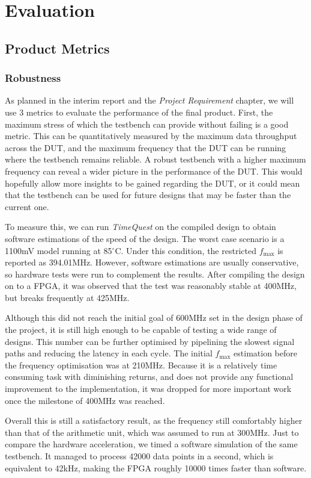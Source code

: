 \chapter{Evaluation}

\section{Product Metrics}
\subsection{Robustness}
As planned in the interim report and the \textit{Project Requirement} chapter, we will use 3 metrics to evaluate the performance of the final product.
First, the maximum stress of which the testbench can provide without failing is a good metric.
This can be quantitatively measured by the maximum data throughput across the DUT, and the maximum frequency that the DUT can be running where the testbench remains reliable.
A robust testbench with a higher maximum frequency can reveal a wider picture in the performance of the DUT.
This would hopefully allow more insights to be gained regarding the DUT, or it could mean that the testbench can be used for future designs that may be faster than the current one.

To measure this, we can run \textit{TimeQuest} on the compiled design to obtain software estimations of the speed of the design.
The worst case scenario is a 1100mV model running at 85$^\circ$C.
Under this condition, the restricted $f_\text{max}$ is reported as 394.01MHz.
However, software estimations are usually conservative, so hardware tests were run to complement the results.
After compiling the design on to a FPGA, it was observed that the test was reasonably stable at 400MHz, but breaks frequently at 425MHz.

Although this did not reach the initial goal of 600MHz set in the design phase of the project, it is still high enough to be capable of testing a wide range of designs.
This number can be further optimised by pipelining the slowest signal paths and reducing the latency in each cycle.
The initial $f_\text{max}$ estimation before the frequency optimisation was at 210MHz.
Because it is a relatively time consuming task with diminishing returns, and does not provide any functional improvement to the implementation, it was dropped for more important work once the milestone of 400MHz was reached.

Overall this is still a satisfactory result, as the frequency still comfortably higher than that of the arithmetic unit, which was assumed to run at 300MHz.
Just to compare the hardware acceleration, we timed a software simulation of the same testbench.
It managed to process 42000 data points in a second, which is equivalent to 42kHz, making the FPGA roughly 10000 times faster than software.

